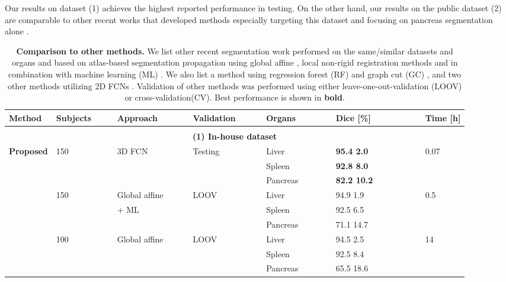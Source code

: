 \documentclass[authoryear]{elsarticle}
\begin{document}
Our results on dataset (1) achieves the highest reported performance in testing. On the other hand, our results on the public dataset (2) are comparable to other recent works that developed methods especially targeting this dataset and focusing on pancreas segmentation alone \citep{roth2017spatial,zhou2016pancreas}. 
\clearpage
\newpage
\begin{table}[ph!]
	\small
\centering
	\caption{\textbf{Comparison to other methods.} We list other recent segmentation work performed on the same/similar datasets and organs and based on atlas-based segmentation propagation using 
		global affine \citep{wang2014geodesic}, 
		local non-rigid registration methods \citep{wolz2013automated} and in combination with machine learning (ML) \citep{tong2015discriminative}. We also list a method using regression forest (RF) and graph cut (GC) \citep{oda2016regression}, and two other methods utilizing 2D FCNs \citep{roth2017spatial,zhou2016pancreas}. Validation of other methods was performed using either leave-one-out-validation (LOOV) or cross-validation(CV). Best performance is shown in \textbf{bold}.}
	\label{tab:comparison}\begin{tabularx}{\linewidth}{*{7}{X}}
\hline
		\rowcolor[gray]{.9}\textbf{Method} & \textbf{Subjects} \ \ \ & \textbf{Approach}  \ \ \ \ \ & \textbf{Validation} \ \ \ \ & \textbf{Organs} \ \ \ \ \ \ & \textbf{Dice [\%]} \ \ \ \ \ \ \ \ \ & \textbf{Time [h]} \\
		\hline
		\hline
		&  &  &  &  &  &  \tabularnewline
		\multicolumn{7}{c}{\textbf{(1) In-house dataset}} \tabularnewline
		\hline		
		\textbf{Proposed} & 150   & 3D FCN & Testing & Liver & \textbf{95.4 2.0} & 0.07 \\
		&       &       &       & Spleen & \textbf{92.8 8.0} &  \\
		&       &       &       & Pancreas & \textbf{82.2 10.2} &  \\
		\rowcolor[gray]{.9}\citet{tong2015discriminative} & 150   & Global affine & LOOV & Liver & 94.9  1.9 & 0.5 \\
		\rowcolor[gray]{.9}      &       &  + ML &       & Spleen & 92.5  6.5 &  \\
		\rowcolor[gray]{.9}      &       &       &       & Pancreas & 71.1  14.7 &  \\
		\citet{wang2014geodesic}& 100     & Global affine & LOOV & Liver & 94.5  2.5 & 14 \\
		  &       &       &       & Spleen & 92.5  8.4 &  \\
		&       &       &       & Pancreas & 65.5  18.6 &  \\

\end{tabularx}
\end{table}
\end{document}
